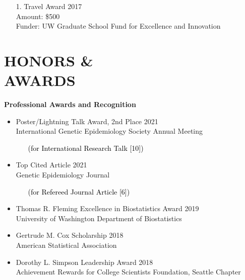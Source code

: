 \documentclass[margin]{res}
\newcommand{\annotateItem}[1]{
	\begin{itemize} \vspace{-0.1cm}
	\item[] 
	\begin{footnotesize}\textcolor{black}{(#1)}\end{footnotesize}
	\end{itemize} \vspace{-0.1cm}
}
\begin{document}
\begin{resume}
\begin{itemize}
\item[1.] Travel Award \hfill 2017 \\
Amount: \$500 \\
Funder: UW Graduate School Fund for Excellence and Innovation \\
\end{itemize}





\section{HONORS \& \\ AWARDS}

\textbf{Professional Awards and Recognition}
\begin{itemize}

\item Poster/Lightning Talk Award, 2nd Place   \hfill 2021 \\
International Genetic Epidemiology Society Annual Meeting
	\annotateItem{for International Research Talk [10]}

\item Top Cited Article  \hfill 2021 \\
Genetic Epidemiology Journal
	\annotateItem{for Refereed Journal Article [6]}

\item Thomas R. Fleming Excellence in Biostatistics Award \hfill 2019 \\   
University of Washington Department of Biostatistics

\item Gertrude M. Cox Scholarship \hfill 2018 \\ American Statistical Association

\item Dorothy L. Simpson Leadership Award \hfill 2018 \\ Achievement Rewards for College Scientists Foundation, Seattle Chapter


\end{itemize}
\end{resume}
\end{document}
